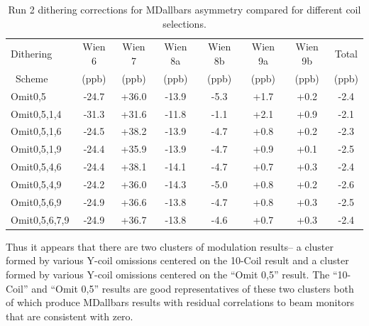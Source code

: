\begin{table}[!h]

\caption{\label{tab:run2_om05_dithering_corrections}Run 2 dithering corrections for MDallbars asymmetry compared for different coil selections.}
\begin{center}
\begin{tabular}[h]{|l||c|c|c|c|c|c||c|}\hline
Dithering& Wien 6& Wien 7& Wien 8a& Wien 8b& Wien 9a& Wien 9b& Total\\
~Scheme&(ppb)&(ppb)&(ppb)&(ppb)&(ppb)&(ppb)&(ppb)\\\hline\hline
Omit0,5& -24.7& +36.0& -13.9& -5.3& +1.7& +0.2& -2.4\\\hline
Omit0,5,1,4& -31.3& +31.6& -11.8& -1.1& +2.1& +0.9& -2.1\\\hline
Omit0,5,1,6& -24.5& +38.2& -13.9& -4.7& +0.8& +0.2& -2.3\\\hline
Omit0,5,1,9& -24.4& +35.9& -13.9& -4.7& +0.9& +0.1& -2.5\\\hline
Omit0,5,4,6& -24.4& +38.1& -14.1& -4.7& +0.7& +0.3& -2.4\\\hline
Omit0,5,4,9& -24.2& +36.0& -14.3& -5.0& +0.8& +0.2& -2.6\\\hline
Omit0,5,6,9& -24.9& +36.6& -13.8& -4.7& +0.8& +0.3& -2.5\\\hline
Omit0,5,6,7,9& -24.9& +36.7& -13.8& -4.6& +0.7& +0.3& -2.4\\\hline
\end{tabular}
\end{center}
\end{table}

Thus it appears that there are two clusters of modulation results-- a cluster formed by various Y-coil omissions centered on the 10-Coil result and a cluster formed by various Y-coil omissions centered on the ``Omit 0,5'' result. The ``10-Coil'' and ``Omit 0,5'' results are good representatives of these two clusters both of which produce MDallbars results with residual correlations to beam monitors that are consistent with zero. 

